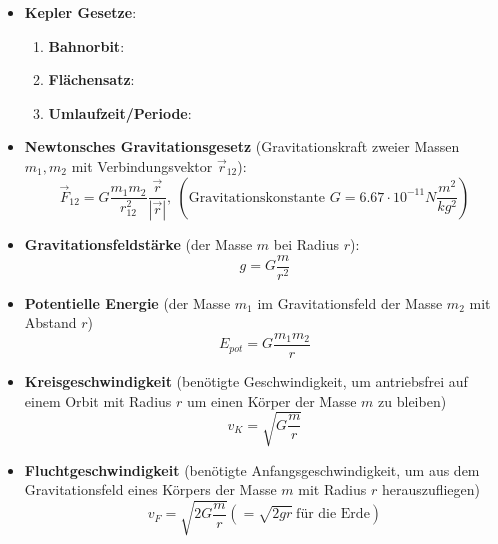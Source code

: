 \begin{itemize}
	\item \textbf{Kepler Gesetze}:
	\begin{enumerate}
		\item \textbf{Bahnorbit}: 
		\item \textbf{Flächensatz}: 
		\item \textbf{Umlaufzeit/Periode}: 
	\end{enumerate}
	\item \textbf{Newtonsches Gravitationsgesetz} (Gravitationskraft zweier Massen $m_1, m_2$ mit Verbindungsvektor $\vec{r}_{12}$):
	\begin{equation}
		\vec{F}_{12} = G\frac{m_1m_2}{r_{12}^2} \frac{\vec{r}}{|\vec{r}|},\ (\text{Gravitationskonstante } G = 6.67 \cdot 10^{-11}N\frac{m^2}{kg^2})
	\end{equation}
	\item \textbf{Gravitationsfeldstärke} (der Masse $m$ bei Radius $r$):
	\begin{equation}
		g = G\frac{m}{r^2}
	\end{equation}
	\item \textbf{Potentielle Energie} (der Masse $m_1$ im Gravitationsfeld der Masse $m_2$ mit Abstand $r$)
	\begin{equation}
		E_{pot} = G\frac{m_1m_2}{r}
	\end{equation}
	\item \textbf{Kreisgeschwindigkeit} (benötigte Geschwindigkeit, um antriebsfrei auf einem Orbit mit Radius $r$ um einen Körper der Masse $m$ zu bleiben)
	\begin{equation}
		v_K = \sqrt{G\frac{m}{r}}
	\end{equation}
	\item \textbf{Fluchtgeschwindigkeit} (benötigte Anfangsgeschwindigkeit, um aus dem Gravitationsfeld eines Körpers der Masse $m$ mit Radius $r$ herauszufliegen)
	\begin{equation}
		v_F = \sqrt{2G\frac{m}{r}} (= \sqrt{2gr}\ \text{für die Erde})
	\end{equation}
\end{itemize}

\newpage
